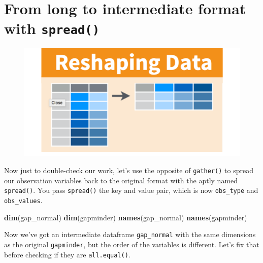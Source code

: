 \documentclass[]{book}
\newenvironment{Shaded}{\begin{snugshade}}{\end{snugshade}}
\newcommand{\KeywordTok}[1]{\textcolor[rgb]{0.13,0.29,0.53}{\textbf{{#1}}}}
\newcommand{\StringTok}[1]{\textcolor[rgb]{0.31,0.60,0.02}{{#1}}}
\newcommand{\NormalTok}[1]{{#1}}
\theoremstyle{definition}
\theoremstyle{definition}
\theoremstyle{definition}
\theoremstyle{remark}
\begin{document}
\section{\texorpdfstring{From long to intermediate format with
\texttt{spread()}}{From long to intermediate format with spread()}}\label{from-long-to-intermediate-format-with-spread}

\begin{figure}[htbp]
\centering
\includegraphics{img/rstudio-cheatsheet-reshaping-data-spread.png}
\caption{}
\end{figure}

Now just to double-check our work, let's use the opposite of
\texttt{gather()} to spread our observation variables back to the
original format with the aptly named \texttt{spread()}. You pass
\texttt{spread()} the key and value pair, which is now
\texttt{obs\_type} and \texttt{obs\_values}.

\begin{Shaded}
\end{Shaded}

\begin{Shaded}
\begin{Highlighting}[]
\KeywordTok{dim}\NormalTok{(gap_normal)}
\KeywordTok{dim}\NormalTok{(gapminder)}
\KeywordTok{names}\NormalTok{(gap_normal)}
\KeywordTok{names}\NormalTok{(gapminder)}
\end{Highlighting}
\end{Shaded}

Now we've got an intermediate dataframe \texttt{gap\_normal} with the
same dimensions as the original \texttt{gapminder}, but the order of the
variables is different. Let's fix that before checking if they are
\texttt{all.equal()}.
\end{document}
